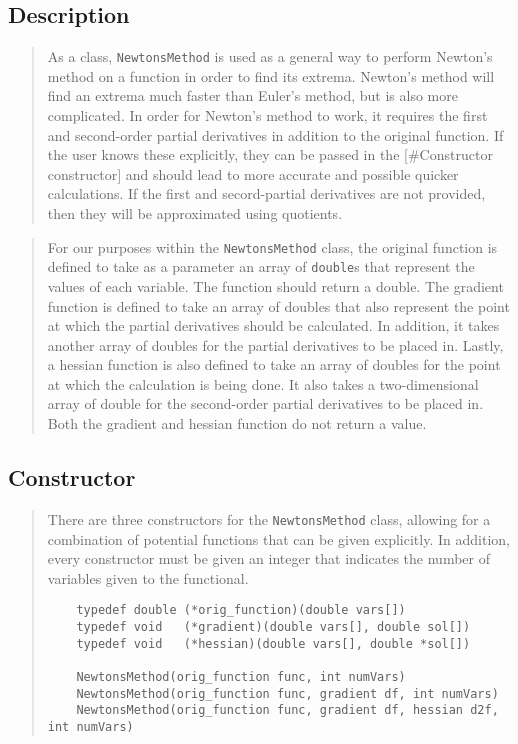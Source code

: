 \documentclass[10pt]{article}%
\begin{document}
\subsection*{Description}

\begin{quotation} As a class, \texttt{NewtonsMethod} is used as a general way to perform Newton's method on a function in order to find its extrema. Newton's method will find an extrema much faster than Euler's method, but is also more complicated. In order for Newton's method to work, it requires the first and second-order partial derivatives in addition to the original function. If the user knows these explicitly, they can be passed in the \mbox{$[$}\#Constructor constructor\mbox{$]$} and should lead to more accurate and possible quicker calculations. If the first and secord-partial derivatives are not provided, then they will be approximated using quotients.\end{quotation}
\begin{quotation} For our purposes within the \texttt{NewtonsMethod} class, the original function is defined to take as a parameter an array of \texttt{double}s that represent the values of each variable. The function should return a double. The gradient function is defined to take an array of doubles that also represent the point at which the partial derivatives should be calculated. In addition, it takes another array of doubles for the partial derivatives to be placed in. Lastly, a hessian function is also defined to take an array of doubles for the point at which the calculation is being done. It also takes a two-dimensional array of double for the second-order partial derivatives to be placed in. Both the gradient and hessian function do not return a value.\end{quotation}

\subsection*{Constructor}

\begin{quotation} There are three constructors for the \texttt{NewtonsMethod} class, allowing for a combination of potential functions that can be given explicitly. In addition, every constructor must be given an integer that indicates the number of variables given to the functional.{\small{\begin{verbatim} 
    typedef double (*orig_function)(double vars[])
    typedef void   (*gradient)(double vars[], double sol[])
    typedef void   (*hessian)(double vars[], double *sol[])

    NewtonsMethod(orig_function func, int numVars)
    NewtonsMethod(orig_function func, gradient df, int numVars)
    NewtonsMethod(orig_function func, gradient df, hessian d2f, int numVars)
  \end{verbatim}
}}
\end{quotation}
\end{document}
